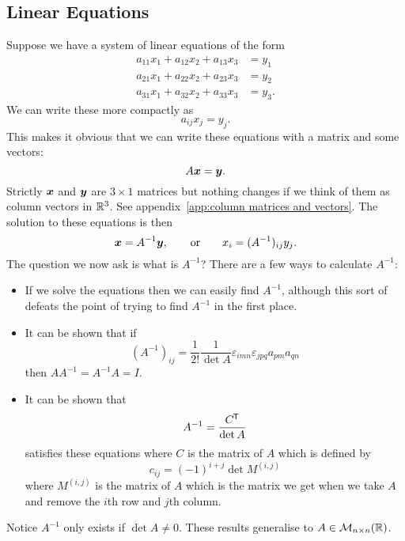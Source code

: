 \subsection{Linear Equations}
Suppose we have a system of linear equations of the form
\begin{align*}
    a_{11}x_1 + a_{12}x_2 + a_{13}x_3 &= y_1\\
    a_{21}x_1 + a_{22}x_2 + a_{23}x_3 &= y_2\\
    a_{31}x_1 + a_{32}x_2 + a_{33}x_3 &= y_3.
\end{align*}
We can write these more compactly as
\[a_{ij}x_j = y_j.\]
This makes it obvious that we can write these equations with a matrix and some vectors:
\[A\bm{x} = \bm{y}.\]
Strictly \(\bm{x}\) and \(\bm{y}\) are \(3\times 1\) matrices but nothing changes if we think of them as column vectors in \(\mathbb{R}^3\).
See appendix~\ref{app:column matrices and vectors}.
The solution to these equations is then
\[\bm{x} = A^{-1}\bm{y}, \qquad\text{or}\qquad x_i = (A^{-1})_{ij}y_j.\]
The question we now ask is what is \(A^{-1}\)?
There are a few ways to calculate \(A^{-1}\):
\begin{itemize}
    \item If we solve the equations then we can easily find \(A^{-1}\), although this sort of defeats the point of trying to find \(A^{-1}\) in the first place.
    
    \item It can be shown that if
    \[(A^{-1})_{ij} = \frac{1}{2!}\frac{1}{\det A}\varepsilon_{imn}\varepsilon_{jpq}a_{pm}a_{qn}\]
    then \(AA^{-1} = A^{-1}A = I\).
    
    \item It can be shown that
    \[A^{-1} = \frac{C^{\mkern-1.5mu\mathsf{T}}}{\det A}\]
    satisfies these equations where \(C\) is the  matrix of \(A\) which is defined by
    \[c_{ij} = (-1)^{i + j}\det M^{(i, j)}\]
    where \(M^{(i, j)}\) is the  matrix of \(A\) which is the matrix we get when we take \(A\) and remove the \(i\)th row and \(j\)th column.
\end{itemize}
Notice \(A^{-1}\) only exists if \(\det A \ne 0\).
These results generalise to \(A\in\mathcal{M}_{{n}\times{n}}({\mathbb{R}})\).

